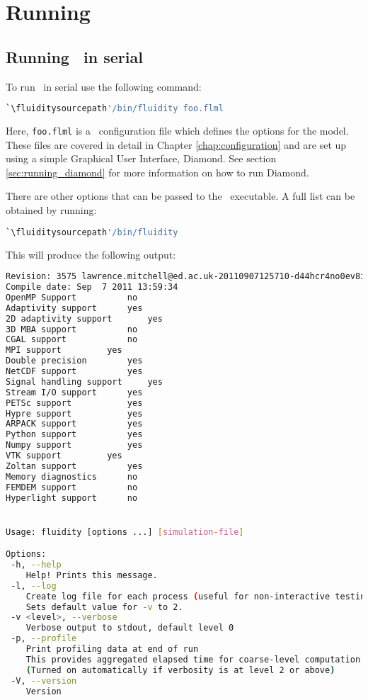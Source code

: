 \section{Running \fluidity}
\label{sec:running_fluidity}


\subsection{Running \fluidity\ in serial}
\label{sec:running_fluidity_in_serial}

To run \fluidity\ in serial use the following command:

\begin{lstlisting}[language=bash]
`\fluiditysourcepath'/bin/fluidity foo.flml
\end{lstlisting}

Here, \lstinline[language=Bash]+foo.flml+ is a \fluidity\ configuration file
which defines the options for the model. These files are covered in detail in
Chapter \ref{chap:configuration} and are set up using a simple Graphical User
Interface, Diamond. See section \ref{sec:running_diamond} for more information
on how to run Diamond.

There are other options that can be passed to the \fluidity\ executable. A full
list can be obtained by running:

\begin{lstlisting}[language=bash]
`\fluiditysourcepath'/bin/fluidity
\end{lstlisting}

This will produce the following output:

\begin{lstlisting}[language=Bash]
Revision: 3575 lawrence.mitchell@ed.ac.uk-20110907125710-d44hcr4no0ev8icc
Compile date: Sep  7 2011 13:59:34
OpenMP Support			no
Adaptivity support		yes
2D adaptivity support		yes
3D MBA support			no
CGAL support			no
MPI support			yes
Double precision		yes
NetCDF support			yes
Signal handling support		yes
Stream I/O support		yes
PETSc support			yes
Hypre support			yes
ARPACK support			yes
Python support			yes
Numpy support			yes
VTK support			yes
Zoltan support			yes
Memory diagnostics		no
FEMDEM support			no
Hyperlight support		no


Usage: fluidity [options ...] [simulation-file]

Options:
 -h, --help
    Help! Prints this message.
 -l, --log
    Create log file for each process (useful for non-interactive testing).
    Sets default value for -v to 2.
 -v <level>, --verbose
    Verbose output to stdout, default level 0
 -p, --profile
    Print profiling data at end of run
    This provides aggregated elapsed time for coarse-level computation
    (Turned on automatically if verbosity is at level 2 or above)
 -V, --version
    Version
\end{lstlisting}

